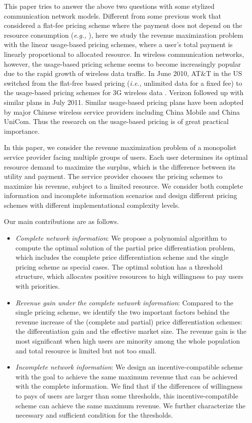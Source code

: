 \documentclass[twocolumn,10pt,twosided]{IEEEtran}
\newcommand{\eg}{\emph{e.g., }}
\newcommand{\ie}{\emph{i.e., }}
\begin{document}
This paper tries to answer the above two questions with some stylized communication network models.
Different from some previous work that considered a flat-fee pricing scheme where the payment does not depend on the resource consumption (\eg \cite{acemoglu2004marginal,gibbens2000internet, shakkottai2008price}), here we study the revenue maximization problem with the linear usage-based pricing schemes, where a user's total payment is linearly proportional to allocated resource. In  wireless communication networks, however, the usage-based pricing scheme seems to become increasingly popular due to the rapid growth of wireless data traffic. In June 2010,  AT$\&$T in the US switched from the flat-free based pricing (\ie unlimited data  for a fixed fee) to the  usage-based pricing schemes for 3G wireless data \cite{news1}.  Verizon followed up with similar plans in July 2011. Similar usage-based pricing plans have been adopted by major Chinese wireless service providers including China Mobile and China UniCom.
Thus the research on the usage-based pricing is of great practical importance.

In this paper,  we consider the revenue maximization problem of a monopolist service provider facing multiple groups of users. Each user determines its optimal resource demand to maximize the surplus, which is the difference between its utility and payment. The service provider chooses the pricing schemes to maximize his revenue, subject to a limited resource. We consider both complete information and incomplete information scenarios and design different pricing schemes with different implementational complexity levels.

Our main contributions are as follows.
\begin{itemize}
    \item \emph{Complete network information}: We propose a polynomial algorithm to compute the optimal solution of the partial price differentiation problem, which includes the complete price differentiation scheme and the single pricing scheme as special cases. The optimal solution has a threshold structure, which allocates positive resources to high willingness to pay users with priorities.
	 \item \emph{Revenue gain under the complete network information}: Compared to the single pricing scheme, we identify the two important factors behind the revenue increase of the (complete and partial) price differentiation schemes: the differentiation gain and the effective market size. The revenue gain is the most significant when high users are minority among the whole population and total resource is limited but not too small.
	 \item \emph{Incomplete network information}: We design an incentive-compatible scheme with the goal to achieve the same maximum revenue that can be achieved with the complete information. We find that if the differences of willingness to pays of users are larger than some thresholds, this incentive-compatible scheme can achieve the same maximum revenue. We further characterize the necessary and sufficient condition for the thresholds.
\end{itemize}
\end{document}
